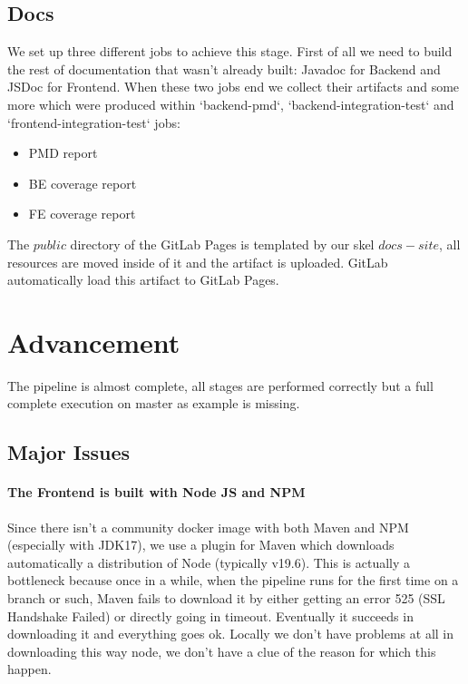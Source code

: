 \documentclass[a4paper,10pt]{scrartcl}
\begin{document}
\subsection{Docs}

We set up three different jobs to achieve this stage. First of all we need to build the rest of documentation that wasn't already built: Javadoc for Backend and JSDoc for Frontend. When these two jobs end we collect their artifacts and some more which were produced within `backend-pmd`, `backend-integration-test` and `frontend-integration-test` jobs:
\begin{itemize}
    \item PMD report
    \item BE coverage report
    \item FE coverage report
\end{itemize}

The $public$ directory of the GitLab Pages is templated by our skel $docs-site$, all resources are moved inside of it and the artifact is uploaded. GitLab automatically load this artifact to GitLab Pages.

\section{Advancement}

The pipeline is almost complete, all stages are performed correctly but a full complete execution on master as example is missing.

\subsection{Major Issues}

\paragraph{The Frontend is built with Node JS and NPM}

Since there isn't a community docker image with both Maven and NPM (especially with JDK17), we use a plugin for Maven which downloads automatically a distribution of Node (typically v19.6). This is actually a bottleneck because once in a while, when the pipeline runs for the first time on a branch or such, Maven fails to download it by either getting an error 525 (SSL Handshake Failed) or directly going in timeout. Eventually it succeeds in downloading it and everything goes ok. Locally we don't have problems at all in downloading this way node, we don't have a clue of the reason for which this happen.
\end{document}
